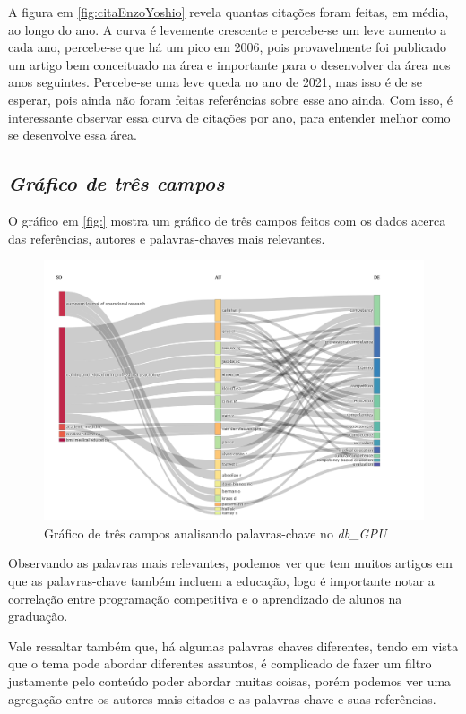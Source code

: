 A figura em \ref{fig:citaEnzoYoshio} revela quantas citações foram feitas, em média, ao longo do ano. A curva é levemente crescente e percebe-se um leve aumento a cada ano, percebe-se que há um pico em 2006, pois provavelmente foi publicado um artigo bem conceituado na área e importante para o desenvolver da área nos anos seguintes. Percebe-se uma leve queda no ano de 2021, mas isso é de se esperar, pois ainda não foram feitas referências sobre esse ano ainda. Com isso, é interessante observar essa curva de citações por ano, para entender melhor como se desenvolve essa área.

\subsection{\textit{Gráfico de três campos}}

O gráfico em \ref{fig:} mostra um gráfico de três campos feitos com os dados acerca das referências, autores e palavras-chaves mais relevantes.

\begin{figure}[ht]
    \centering
    \includegraphics[width=12cm]{experiments/enzoyoshio/AnaliseBibliometrica/threeFieldsPlot.png}
    \caption{Gráfico de três campos analisando palavras-chave no \textit{db\_GPU}}
    \label{fig:threeFieldEnzoY}
\end{figure}

Observando as palavras mais relevantes, podemos ver que tem muitos artigos em que as palavras-chave também incluem a educação, logo é importante notar a correlação entre programação competitiva e o aprendizado de alunos na graduação.

Vale ressaltar também que, há algumas palavras chaves diferentes, tendo em vista que o tema pode abordar diferentes assuntos, é complicado de fazer um filtro justamente pelo conteúdo poder abordar muitas coisas, porém podemos ver uma agregação entre os autores mais citados e as palavras-chave e suas referências.